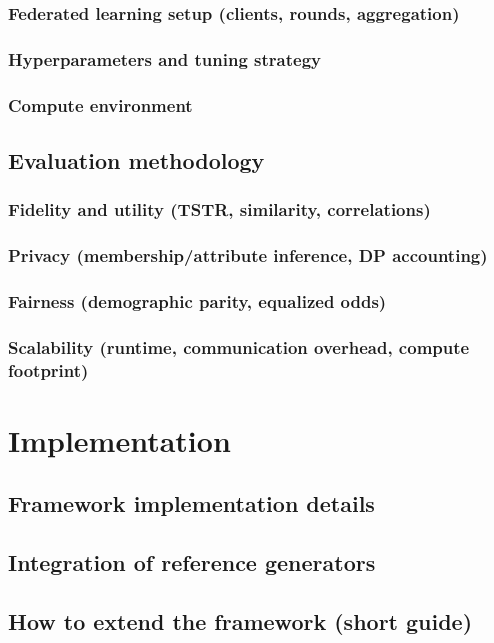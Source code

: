 \documentclass{article}
\begin{document}
\subsubsection{Federated learning setup (clients, rounds, aggregation)}
\subsubsection{Hyperparameters and tuning strategy}
\subsubsection{Compute environment}

\subsection{Evaluation methodology}
\subsubsection{Fidelity and utility (TSTR, similarity, correlations)}
\subsubsection{Privacy (membership/attribute inference, DP accounting)}
\subsubsection{Fairness (demographic parity, equalized odds)}
\subsubsection{Scalability (runtime, communication overhead, compute footprint)}

\section{Implementation}

\subsection{Framework implementation details}

\subsection{Integration of reference generators}

\subsection{How to extend the framework (short guide)}
\end{document}
